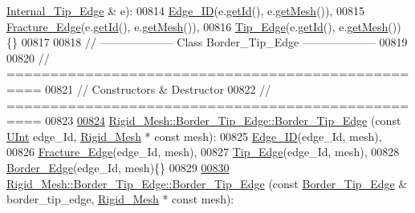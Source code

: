 \begin{DoxyCode}
      \hyperlink{classFVCode3D_1_1Rigid__Mesh_1_1Internal__Tip__Edge}{Internal\_Tip\_Edge} & e):
00814     \hyperlink{classFVCode3D_1_1Rigid__Mesh_1_1Edge__ID}{Edge\_ID}(e.\hyperlink{classFVCode3D_1_1Rigid__Mesh_1_1Edge__ID_af17ee26739dd0bb462a21a90c2c1e633}{getId}(), e.\hyperlink{classFVCode3D_1_1Rigid__Mesh_1_1Edge__ID_a197a8049cfb5e26c077f668ffb49e6eb}{getMesh}()),
00815     \hyperlink{classFVCode3D_1_1Rigid__Mesh_1_1Fracture__Edge}{Fracture\_Edge}(e.\hyperlink{classFVCode3D_1_1Rigid__Mesh_1_1Edge__ID_af17ee26739dd0bb462a21a90c2c1e633}{getId}(), e.\hyperlink{classFVCode3D_1_1Rigid__Mesh_1_1Edge__ID_a197a8049cfb5e26c077f668ffb49e6eb}{getMesh}()),
00816     \hyperlink{classFVCode3D_1_1Rigid__Mesh_1_1Tip__Edge}{Tip\_Edge}(e.\hyperlink{classFVCode3D_1_1Rigid__Mesh_1_1Edge__ID_af17ee26739dd0bb462a21a90c2c1e633}{getId}(), e.\hyperlink{classFVCode3D_1_1Rigid__Mesh_1_1Edge__ID_a197a8049cfb5e26c077f668ffb49e6eb}{getMesh}())\{\}
00817 
00818 \textcolor{comment}{// --------------------   Class Border\_Tip\_Edge   --------------------}
00819 
00820 \textcolor{comment}{// ==================================================}
00821 \textcolor{comment}{// Constructors & Destructor}
00822 \textcolor{comment}{// ==================================================}
00823 
\hypertarget{RigidMesh_8cpp_source.tex_l00824}{}\hyperlink{classFVCode3D_1_1Rigid__Mesh_1_1Border__Tip__Edge_ab533abba01ed6878748be717d830df17}{00824} \hyperlink{classFVCode3D_1_1Rigid__Mesh_1_1Border__Tip__Edge_ab533abba01ed6878748be717d830df17}{Rigid\_Mesh::Border\_Tip\_Edge::Border\_Tip\_Edge} (\textcolor{keyword}{const} 
      \hyperlink{namespaceFVCode3D_a4bf7e328c75d0fd504050d040ebe9eda}{UInt} edge\_Id, \hyperlink{classFVCode3D_1_1Rigid__Mesh}{Rigid\_Mesh} * \textcolor{keyword}{const} mesh):
00825     \hyperlink{classFVCode3D_1_1Rigid__Mesh_1_1Edge__ID}{Edge\_ID}(edge\_Id, mesh),
00826     \hyperlink{classFVCode3D_1_1Rigid__Mesh_1_1Fracture__Edge}{Fracture\_Edge}(edge\_Id, mesh),
00827     \hyperlink{classFVCode3D_1_1Rigid__Mesh_1_1Tip__Edge}{Tip\_Edge}(edge\_Id, mesh),
00828     \hyperlink{classFVCode3D_1_1Rigid__Mesh_1_1Border__Edge}{Border\_Edge}(edge\_Id, mesh)\{\}
00829 
\hypertarget{RigidMesh_8cpp_source.tex_l00830}{}\hyperlink{classFVCode3D_1_1Rigid__Mesh_1_1Border__Tip__Edge_a69d258bd9bd9c92de2d024cbb4905d32}{00830} \hyperlink{classFVCode3D_1_1Rigid__Mesh_1_1Border__Tip__Edge_ab533abba01ed6878748be717d830df17}{Rigid\_Mesh::Border\_Tip\_Edge::Border\_Tip\_Edge} (\textcolor{keyword}{const} 
      \hyperlink{classFVCode3D_1_1Rigid__Mesh_1_1Border__Tip__Edge}{Border\_Tip\_Edge} & border\_tip\_edge, \hyperlink{classFVCode3D_1_1Rigid__Mesh}{Rigid\_Mesh} * \textcolor{keyword}{const} mesh):

\end{DoxyCode}
